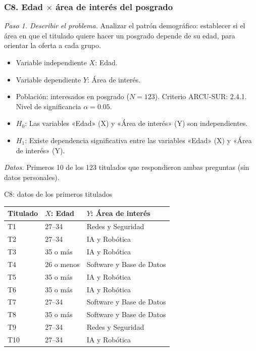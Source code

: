 \subsubsection*{C8. Edad $\times$ área de interés del posgrado}

\textit{Paso 1. Describir el problema.} Analizar el patrón demográfico: establecer si el área en que el titulado quiere hacer un posgrado depende de su edad, para orientar la oferta a cada grupo.

\begin{itemize}[nosep]
  \item Variable independiente $X$: Edad.
  \item Variable dependiente $Y$: Área de interés.
  \item Población: interesados en posgrado ($N = 123$). Criterio ARCU-SUR: 2.4.1. Nivel de significancia $\alpha = 0.05$.
  \item $H_0$: Las variables «Edad» (X) y «Área de interés» (Y) son independientes.
  \item $H_1$: Existe dependencia significativa entre las variables «Edad» (X) y «Área de interés» (Y).
\end{itemize}

\textit{Datos.} Primeros 10 de los 123 titulados que respondieron ambas preguntas (sin datos personales).

\begin{mitabla}{C8: datos de los primeros titulados}
\begin{tabular}{lll}
\toprule
Titulado & $X$: Edad & $Y$: Área de interés \\
\midrule
T1 & 27–34 & Redes y Seguridad \\
T2 & 27–34 & IA y Robótica \\
T3 & 35 o más & IA y Robótica \\
T4 & 26 o menos & Software y Base de Datos \\
T5 & 35 o más & IA y Robótica \\
T6 & 35 o más & IA y Robótica \\
T7 & 27–34 & Software y Base de Datos \\
T8 & 35 o más & Software y Base de Datos \\
T9 & 27–34 & Redes y Seguridad \\
T10 & 27–34 & IA y Robótica \\
\bottomrule
\end{tabular}
\end{mitabla}

